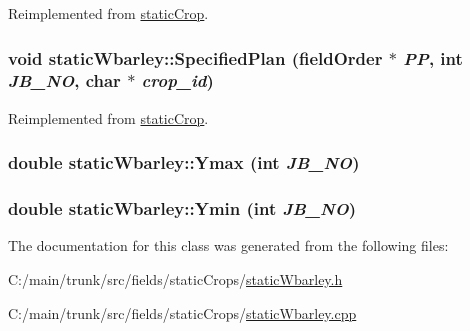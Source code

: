 Reimplemented from \hyperlink{classstatic_crop_ab7763e4e6a0b9eff1788cb86ebad8170}{staticCrop}.\hypertarget{classstatic_wbarley_a27f5a783e0d40a5114a80da6d68649ef}{
\subsubsection[{SpecifiedPlan}]{\setlength{\rightskip}{0pt plus 5cm}void staticWbarley::SpecifiedPlan ({\bf fieldOrder} $\ast$ {\em PP}, \/  int {\em JB\_\-NO}, \/  char $\ast$ {\em crop\_\-id})}}
\label{classstatic_wbarley_a27f5a783e0d40a5114a80da6d68649ef}


Reimplemented from \hyperlink{classstatic_crop_af19d8a1e4f4833325f6712c22ede8b45}{staticCrop}.\hypertarget{classstatic_wbarley_adef88f6c141b39f5067652b7c28dcbc6}{
\subsubsection[{Ymax}]{\setlength{\rightskip}{0pt plus 5cm}double staticWbarley::Ymax (int {\em JB\_\-NO})}}
\label{classstatic_wbarley_adef88f6c141b39f5067652b7c28dcbc6}
\hypertarget{classstatic_wbarley_a59813209533f8f0ce14ad345d748de59}{
\subsubsection[{Ymin}]{\setlength{\rightskip}{0pt plus 5cm}double staticWbarley::Ymin (int {\em JB\_\-NO})}}
\label{classstatic_wbarley_a59813209533f8f0ce14ad345d748de59}


The documentation for this class was generated from the following files:\begin{DoxyCompactItemize}
\item 
C:/main/trunk/src/fields/staticCrops/\hyperlink{static_wbarley_8h}{staticWbarley.h}\item 
C:/main/trunk/src/fields/staticCrops/\hyperlink{static_wbarley_8cpp}{staticWbarley.cpp}\end{DoxyCompactItemize}
